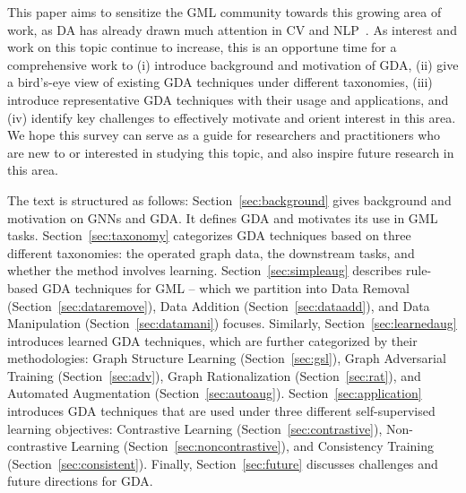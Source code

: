 \documentclass[11pt]{article}
\begin{document}
This paper aims to sensitize the GML community towards this growing area of work, as DA has already drawn much attention in CV and NLP~\cite{cubuk2019autoaugment,feng2021survey}.
As interest and work on this topic continue to increase, this is an opportune time for a comprehensive work to (i) introduce background and motivation of GDA, (ii) give a bird's-eye view of existing GDA techniques under different taxonomies, (iii) introduce representative GDA techniques with their usage and applications, and (iv) identify key challenges to effectively motivate and orient interest in this area.
We hope this survey can serve as a guide for researchers and practitioners who are new to or interested in studying this topic, and also inspire future research in this area.

The text is structured as follows: Section~\ref{sec:background} gives background and motivation on GNNs and GDA. It defines GDA and motivates its use in GML tasks.
Section~\ref{sec:taxonomy} categorizes GDA techniques based on three different taxonomies: the operated graph data, the downstream tasks, and whether the method involves learning. Section~\ref{sec:simpleaug} describes rule-based GDA techniques for GML -- which we partition into Data Removal (Section~\ref{sec:dataremove}), Data Addition (Section~\ref{sec:dataadd}), and Data Manipulation (Section~\ref{sec:datamani}) focuses. Similarly, Section~\ref{sec:learnedaug} introduces learned GDA techniques, which are further categorized by their methodologies: Graph Structure Learning (Section~\ref{sec:gsl}), Graph Adversarial Training (Section~\ref{sec:adv}), Graph Rationalization (Section~\ref{sec:rat}), and Automated Augmentation (Section~\ref{sec:autoaug}).
Section~\ref{sec:application} introduces GDA techniques that are used under three different self-supervised learning objectives: Contrastive Learning (Section~\ref{sec:contrastive}), Non-contrastive Learning (Section~\ref{sec:noncontrastive}), and Consistency Training (Section~\ref{sec:consistent}). Finally, Section~\ref{sec:future} discusses challenges and future directions for GDA.
\end{document}
